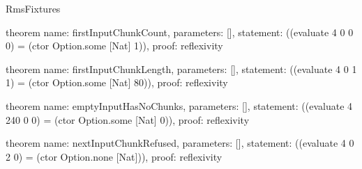 \begin{lexlean}{RmsFixtures}
\begin{semanticmodule}
theorem{
  name: firstInputChunkCount,
  parameters: [],
  statement: ((evaluate 4 0 0 0) = (ctor Option.some [Nat] 1)),
  proof: reflexivity{}
}

theorem{
  name: firstInputChunkLength,
  parameters: [],
  statement: ((evaluate 4 0 1 1) = (ctor Option.some [Nat] 80)),
  proof: reflexivity{}
}

theorem{
  name: emptyInputHasNoChunks,
  parameters: [],
  statement: ((evaluate 4 240 0 0) = (ctor Option.some [Nat] 0)),
  proof: reflexivity{}
}

theorem{
  name: nextInputChunkRefused,
  parameters: [],
  statement: ((evaluate 4 0 2 0) = (ctor Option.none [Nat])),
  proof: reflexivity{}
}
\end{semanticmodule}
\end{lexlean}
